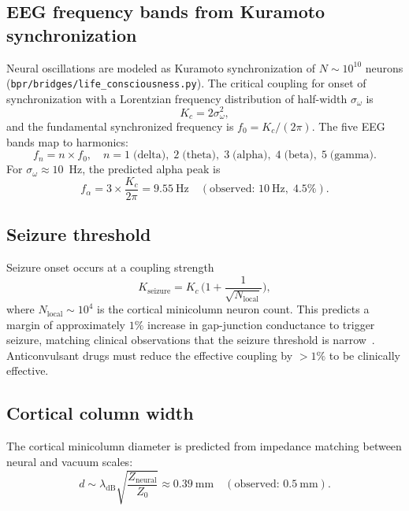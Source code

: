 \documentclass[aps,prd,twocolumn,superscriptaddress,longbibliography,nofootinbib]{revtex4-2}
\newcommand{\Zimp}{Z}
\newcommand{\Zvac}{Z_0}
\begin{document}
\subsection{EEG frequency bands from Kuramoto synchronization}

Neural oscillations are modeled as Kuramoto synchronization of
$N \sim 10^{10}$ neurons
(\texttt{bpr/bridges/life\_consciousness.py}).  The critical
coupling for onset of synchronization with a Lorentzian frequency
distribution of half-width $\sigma_\omega$ is
\begin{equation}
K_c = 2\sigma_\omega^2,
\label{eq:Kc}
\end{equation}
and the fundamental synchronized frequency is $f_0 = K_c/(2\pi)$.
The five EEG bands map to harmonics:
\begin{equation}
f_n = n \times f_0, \quad n = 1\;\text{(delta)},\; 2\;\text{(theta)},
\; 3\;\text{(alpha)},\; 4\;\text{(beta)},\; 5\;\text{(gamma)}.
\label{eq:eeg_bands}
\end{equation}
For $\sigma_\omega \approx 10$~Hz, the predicted alpha peak is
\begin{equation}
f_\alpha = 3 \times \frac{K_c}{2\pi} = 9.55~\text{Hz}
\quad (\text{observed: } 10~\text{Hz},\; 4.5\%).
\label{eq:alpha_peak}
\end{equation}

\subsection{Seizure threshold}

Seizure onset occurs at a coupling strength
\begin{equation}
K_{\mathrm{seizure}} = K_c\,\biggl(1 +
  \frac{1}{\sqrt{N_{\mathrm{local}}}}\biggr),
\label{eq:seizure}
\end{equation}
where $N_{\mathrm{local}} \sim 10^4$ is the cortical minicolumn
neuron count.  This predicts a margin of approximately $1\%$
increase in gap-junction conductance to trigger seizure, matching
clinical observations that the seizure threshold is
narrow~\cite{Breakspear2006}.  Anticonvulsant drugs must reduce the
effective coupling by $> 1\%$ to be clinically effective.

\subsection{Cortical column width}

The cortical minicolumn diameter is predicted from impedance
matching between neural and vacuum scales:
\begin{equation}
d \sim \lambda_{\mathrm{dB}} \sqrt{\frac{\Zimp_{\mathrm{neural}}}{\Zvac}}
\approx 0.39~\text{mm}
\quad (\text{observed: } 0.5~\text{mm}).
\label{eq:cortical}
\end{equation}
\end{document}
